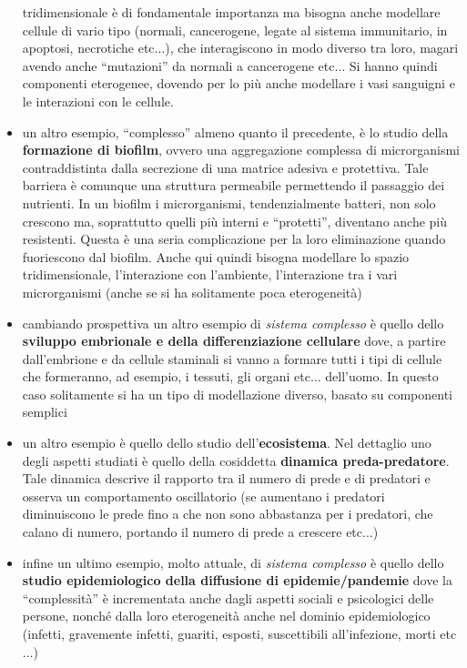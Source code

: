 \documentclass[a4paper,12pt, oneside]{book}
\begin{document}
\begin{itemize}
  tridimensionale è di fondamentale importanza ma bisogna anche modellare
  cellule di vario tipo (normali, cancerogene, legate al sistema immunitario, in
  apoptosi, necrotiche
  etc$\ldots$), che interagiscono in modo diverso tra loro, magari avendo anche
  ``mutazioni'' da normali a cancerogene etc$\ldots$ Si hanno quindi componenti
  eterogenee, dovendo per lo più anche modellare i vasi sanguigni e le
  interazioni con le cellule.
  \item un altro esempio, ``complesso'' almeno quanto il precedente, è lo studio
  della \textbf{formazione di biofilm}, ovvero una aggregazione complessa di
  microrganismi contraddistinta dalla secrezione di una matrice adesiva e
  protettiva. Tale barriera è comunque una struttura permeabile permettendo il
  passaggio dei nutrienti. In un biofilm i microrganismi, tendenzialmente batteri, non solo
  crescono ma, soprattutto quelli più interni e ``protetti'', diventano anche
  più resistenti. Questa è una seria complicazione per la loro eliminazione
  quando fuoriescono dal biofilm. Anche qui quindi bisogna modellare lo spazio
  tridimensionale, l'interazione con l'ambiente, l'interazione tra i vari
  microrganismi (anche se si ha solitamente poca eterogeneità)
  \item cambiando prospettiva un altro esempio di \textit{sistema complesso} è
  quello dello \textbf{sviluppo embrionale e della differenziazione cellulare}
  dove, a partire dall'embrione e da cellule staminali si vanno a formare tutti
  i tipi di cellule che formeranno, ad esempio, i tessuti, gli organi
  etc$\ldots$ dell'uomo. In questo caso solitamente si ha un tipo di
  modellazione diverso, basato su componenti semplici 
  \item un altro esempio è quello dello studio dell'\textbf{ecosistema}. Nel
  dettaglio uno degli aspetti studiati è quello della cosiddetta
  \textbf{dinamica preda-predatore}. Tale dinamica descrive il rapporto tra il
  numero di prede e di predatori e osserva un comportamento oscillatorio (se
  aumentano i predatori diminuiscono le prede fino a che non sono abbastanza per
  i predatori, che calano di numero, portando il numero di prede a crescere
  etc$\ldots$) 
  \item infine un ultimo esempio, molto attuale, di \textit{sistema complesso} è
  quello dello \textbf{studio epidemiologico della diffusione di
    epidemie/pandemie} dove la ``complessità'' è incrementata anche dagli
  aspetti sociali e psicologici delle persone, nonché dalla loro eterogeneità
  anche nel dominio epidemiologico (infetti, gravemente infetti, guariti,
  esposti, suscettibili all'infezione, morti etc$\ldots$)
\end{itemize}
\end{document}
